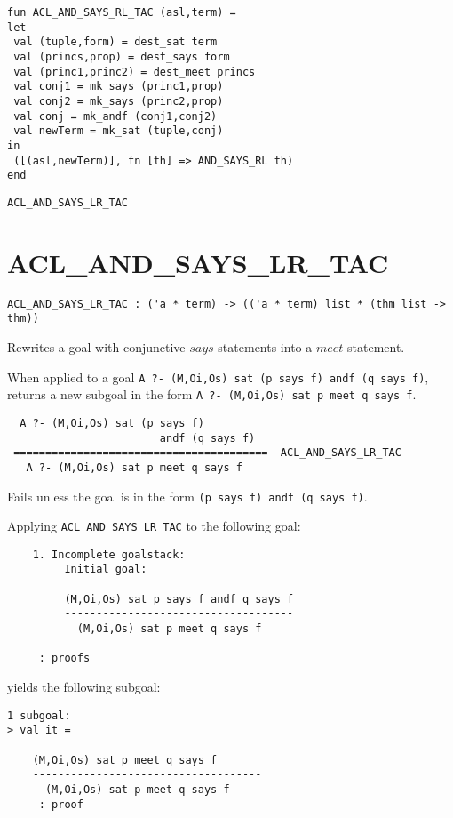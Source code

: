 \IMPLEMENTATION
\begin{holboxed}
\begin{verbatim}
fun ACL_AND_SAYS_RL_TAC (asl,term) =
let
 val (tuple,form) = dest_sat term
 val (princs,prop) = dest_says form
 val (princ1,princ2) = dest_meet princs
 val conj1 = mk_says (princ1,prop)
 val conj2 = mk_says (princ2,prop)
 val conj = mk_andf (conj1,conj2)
 val newTerm = mk_sat (tuple,conj)
in
 ([(asl,newTerm)], fn [th] => AND_SAYS_RL th)
end
\end{verbatim}
\end{holboxed}

\SEEALSO
\texttt{ACL\_AND\_SAYS\_LR\_TAC}
\ENDDOC

\section{ACL\_AND\_SAYS\_LR\_TAC}



\small{
\begin{lstlisting}[breaklines]
ACL_AND_SAYS_LR_TAC : ('a * term) -> (('a * term) list * (thm list -> thm))
\end{lstlisting}}\egroup


\SYNOPSIS
Rewrites a goal with conjunctive $says$ statements into a $meet$ statement.

\DESCRIBE When applied to a goal \texttt{A ?- (M,Oi,Os) sat (p says f) andf (q says f)}, returns a new subgoal in the form \texttt{A ?- (M,Oi,Os) sat p meet q says f}.
\begin{verbatim}
  A ?- (M,Oi,Os) sat (p says f) 
                        andf (q says f)
 ========================================  ACL_AND_SAYS_LR_TAC
   A ?- (M,Oi,Os) sat p meet q says f
\end{verbatim}

\FAILURE 
Fails unless the goal is in the form \texttt{(p says f) andf (q says f)}.

\EXAMPLE
Applying \texttt{ACL\_AND\_SAYS\_LR\_TAC} to the following goal:
\begin{holboxed}
\begin{verbatim}
    1. Incomplete goalstack:
         Initial goal:
    
         (M,Oi,Os) sat p says f andf q says f
         ------------------------------------
           (M,Oi,Os) sat p meet q says f
    
     : proofs
\end{verbatim}
\end{holboxed}
yields the following subgoal:
\begin{holboxed}
\begin{verbatim}
1 subgoal:
> val it =
    
    (M,Oi,Os) sat p meet q says f
    ------------------------------------
      (M,Oi,Os) sat p meet q says f
     : proof
\end{verbatim}
\end{holboxed}

